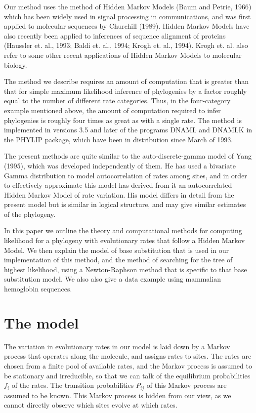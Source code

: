 \documentclass[12pt]{article}
\begin{document}
Our method uses the method of Hidden Markov Models (Baum and Petrie, 1966)
which has been widely used in signal processing in communications,
and was first applied to
molecular sequences by Churchill (1989).  Hidden Markov Models have
also recently been applied to inferences of 
sequence alignment of proteins (Haussler et. al., 1993; Baldi et. al., 1994;
Krogh et. al., 1994).  Krogh et. al. also refer to some
other recent applications of Hidden Markov Models to molecular biology.

The method we describe requires an amount of computation that is
greater than that for simple maximum likelihood inference of phylogenies
by a factor roughly equal to the number of different rate
categories.  Thus, in the four-category example mentioned above,
the amount of computation required to infer phylogenies is roughly four
times as great as with a single rate.  The method is implemented in
versions 3.5 and later of the programs DNAML and DNAMLK in the PHYLIP package,
which have been in distribution since March of 1993.

The present methods are quite similar to the auto-discrete-gamma model
of Yang (1995), which was developed independently of them.  He has used a
bivariate Gamma distribution to model
autocorrelation of rates among sites, and in order to effectively approximate
this model has derived from it an autocorrelated Hidden Markov Model of
rate variation.  His model differs in detail from the present model but is
similar in logical structure, and may give similar estimates of the phylogeny.

In this paper we outline the theory and computational methods for
computing likelihood for a phylogeny with evolutionary rates that follow
a Hidden Markov Model.  We then explain the model of base substitution
that is used in our implementation of this method, and the method of
searching for the tree of highest likelihood, using a Newton-Raphson
method that is specific to that base substitution model.  We also
also give a data example using mammalian hemoglobin sequences.

\section*{The model}

The variation in evolutionary rates in our model is laid down by a Markov
process that operates along the molecule, and assigns rates to sites.  The
rates are chosen from a finite pool of available rates, and the
Markov process is assumed to be stationary and irreducible, so that we can talk of the
equilibrium probabilities $f_i$ of the rates.  The transition probabilities
$P_{ij}$ of this Markov process are assumed to be known.  This Markov process
is hidden from our view, as we cannot directly observe 
which sites evolve at which rates.
\end{document}
